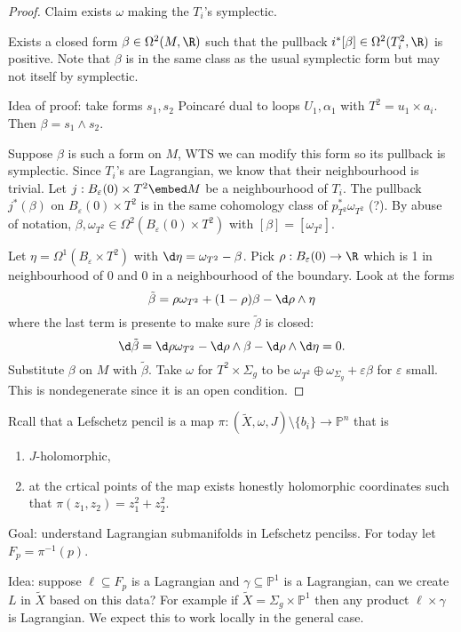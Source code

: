 \documentclass[a4paper]{article}
\renewcommand*{\P}{\mathbb{P}}
\newcommand{\w}{\wedge} %
\begin{document}
\begin{proof}
  Claim exists \(\omega\) making the \(T_i\)'s symplectic.

  Exists a closed form \(\beta \in \Omega^2(M, \R)\) such that the pullback \(i^*[\beta] \in \Omega^2(T_i^2, \R)\) is positive. Note that \(\beta\) is in the same class as the usual symplectic form but may not itself by symplectic.

  Idea of proof: take forms \(s_1, s_2\) Poincaré dual to loops \(U_1, \alpha_1\) with \(T^2 = u_1 \times a_i\). Then \(\beta = s_1 \w s_2\).

  Suppose \(\beta\) is such a form on \(M\), WTS we can modify this form so its pullback is symplectic. Since \(T_i\)'s are Lagrangian, we know that their neighbourhood is trivial. Let \(j: B_\varepsilon(0) \times T^2 \embed M\) be a neighbourhood of \(T_i\). The pullback \(j^*(\beta)\) on \(B_\varepsilon(0) \times T^2\) is in the same cohomology class of \(p^*_{T^2}\omega_{T^2}\) (?). By abuse of notation, \(\beta, \omega_{T^2} \in \Omega^2(B_\varepsilon(0) \times T^2)\) with \([\beta] = [\omega_{T^2}]\).

  Let \(\eta = \Omega^1(B_\varepsilon \times T^2)\) with \(\d \eta = \omega_{T^2} - \beta\). Pick \(\rho: B_\varepsilon(0) \to \R\) which is 1 in neighbourhood of \(0\) and \(0\) in a neighbourhood of the boundary. Look at the forms
  \[
    \tilde \beta = \rho \omega_{T^2} + (1 - \rho) \beta - \d \rho \w \eta
  \]
  where the last term is presente to make sure \(\tilde \beta\) is closed:
  \[
    \d \tilde \beta = \d \rho \omega_{T^2} - \d \rho \w \beta - \d \rho \w \d \eta = 0.
  \]
  Substitute \(\beta\) on \(M\) with \(\tilde \beta\). Take \(\omega\) for \(T^2 \times \Sigma_g\) to be \(\omega_{T^2} \oplus \omega_{\Sigma_g} + \varepsilon \beta\) for \(\varepsilon\) small. This is nondegenerate since it is an open condition.
\end{proof}

Rcall that a Lefschetz pencil is a map \(\pi: (\tilde X, \omega, J) \setminus \{b_i\} \to \P^n\) that is
\begin{enumerate}
\item \(J\)-holomorphic,
\item at the crtical points of the map exists honestly holomorphic coordinates such that \(\pi(z_1, z_2) = z_1^2 + z_2^2\).
\end{enumerate}

Goal: understand Lagrangian submanifolds in Lefschetz pencilss. For today let \(F_p = \pi^{-1}(p)\).

Idea: suppose \(\ell \subseteq F_p\) is a Lagrangian and \(\gamma \subseteq \P^1\) is a Lagrangian, can we create \(L\) in \(\tilde X\) based on this data? For example if \(\tilde X = \Sigma_g \times \P^1\) then any product \(\ell \times \gamma\) is Lagrangian. We expect this to work locally in the general case.
\end{document}
